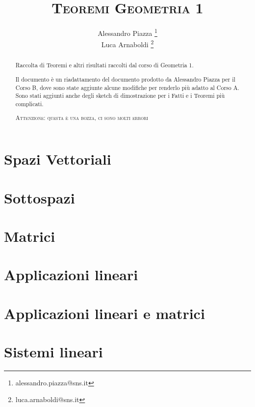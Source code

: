 \documentclass[9pt, a4paper]{article}
\title{\textsc{Teoremi Geometria 1}}
\author{Alessandro Piazza \thanks{alessandro.piazza@sns.it} \\ 
		Luca Arnaboldi \thanks{luca.arnaboldi@sns.it}}
\theoremstyle{mythm}
\begin{document}
\maketitle

\begin{abstract}
	Raccolta di Teoremi e altri risultati raccolti dal corso di Geometria 1.
	
	Il documento è un riadattamento del documento prodotto da Alessandro Piazza per il Corso B, dove sono state aggiunte alcune modifiche per renderlo più adatto al Corso A. 
	Sono stati aggiunti anche degli sketch di dimostrazione per i Fatti e i Teoremi più complicati. 
	\begin{center}
		\textsc{Attenzione: questa è una bozza, ci sono molti errori}
	\end{center}
\end{abstract}

\tableofcontents

\clearpage

\section{Spazi Vettoriali}


\clearpage

\section{Sottospazi}


\clearpage

\section{Matrici}


\clearpage

\section{Applicazioni lineari}


\clearpage

\section{Applicazioni lineari e matrici}


\clearpage

\section{Sistemi lineari}

\end{document}
